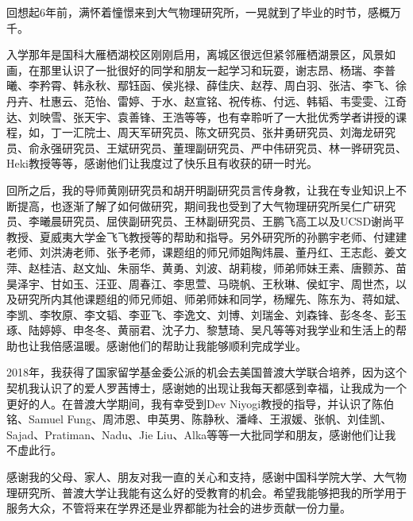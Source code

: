 回想起6年前，满怀着憧憬来到大气物理研究所，一晃就到了毕业的时节，感概万千。

入学那年是国科大雁栖湖校区刚刚启用，离城区很远但紧邻雁栖湖景区，风景如画，在那里认识了一批很好的同学和朋友一起学习和玩耍，谢志昂、杨瑞、李普曦、李矜霄、韩永秋、鄢钰函、侯兆禄、薛佳庆、赵荐、周白羽、张洁、李飞、徐丹卉、杜惠云、范怡、雷婷、于水、赵宣铭、祝传栋、付远、韩韬、韦雯雯、江奇达、刘映雪、张天宇、袁善锋、王浩等等，也有幸聆听了一大批优秀学者讲授的课程，如，丁一汇院士、周天军研究员、陈文研究员、张井勇研究员、刘海龙研究员、俞永强研究员、王斌研究员、董理副研究员、严中伟研究员、林一骅研究员、Heki教授等等，感谢他们让我度过了快乐且有收获的研一时光。

回所之后，我的导师黄刚研究员和胡开明副研究员言传身教，让我在专业知识上不断提高，也逐渐了解了如何做研究，期间我也受到了大气物理研究所吴仁广研究员、李曦晨研究员、屈侠副研究员、王林副研究员、王鹏飞高工以及UCSD谢尚平教授、夏威夷大学金飞飞教授等的帮助和指导。另外研究所的孙鹏宇老师、付建建老师、刘洪涛老师、张予老师，课题组的师兄师姐陶炜晨、董丹红、王志彪、姜文萍、赵桂洁、赵文灿、朱丽华、黄勇、刘波、胡莉梭，师弟师妹王素、唐颢苏、苗昊泽宇、甘如玉、汪亚、周春江、李思萱、马晓帆、王秋琳、侯虹宇、周世杰，以及研究所内其他课题组的师兄师姐、师弟师妹和同学，杨耀先、陈东为、蒋如斌、李凯、李牧原、李文韬、李亚飞、李逸文、刘博、刘瑞金、刘森锋、彭冬冬、彭玉琢、陆婷婷、申冬冬、黄丽君、沈子力、黎慧琦、吴凡等等对我学业和生活上的帮助也让我倍感温暖。感谢他们的帮助让我能够顺利完成学业。

2018年，我获得了国家留学基金委公派的机会去美国普渡大学联合培养，因为这个契机我认识了的爱人罗茜博士，感谢她的出现让我每天都感到幸福，让我成为一个更好的人。在普渡大学期间，我有幸受到Dev Niyogi教授的指导，并认识了陈伯铭、Samuel Fung、周沛恩、申英男、陈静秋、潘峰、王淑媛、张帆、刘佳凯、Sajad、Pratiman、Nadu、Jie Liu、Alka等等一大批同学和朋友，感谢他们让我不虚此行。

感谢我的父母、家人、朋友对我一直的关心和支持，感谢中国科学院大学、大气物理研究所、普渡大学让我能有这么好的受教育的机会。希望我能够把我的所学用于服务大众，不管将来在学界还是业界都能为社会的进步贡献一份力量。


\cleardoublepage[plain]%
